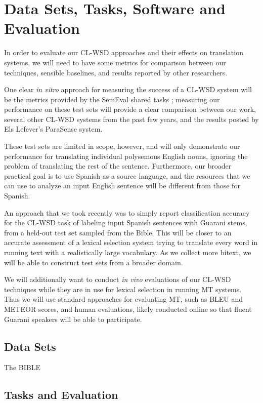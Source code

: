 \chapter{Data Sets, Tasks, Software and Evaluation}
\label{chap:evaluation}

In order to evaluate our CL-WSD approaches and their effects on translation
systems, we will need to have some metrics for comparison between our
techniques, sensible baselines, and results reported by other researchers.

One clear \emph{in vitro} approach for measuring the success of a CL-WSD system
will be the metrics provided by the SemEval shared tasks
\cite{task10}; measuring our performance on these test
sets will provide a clear comparison between our work, several other CL-WSD
systems from the past few years, and the results posted by Els Lefever's
ParaSense system.

These test sets are limited in scope, however, and will only demonstrate our
performance for translating individual polysemous English nouns, ignoring the
problem of translating the rest of the sentence.
Furthermore, our broader practical goal is to use Spanish as a source language,
and the resources that we can use to analyze an input English sentence will be
different from those for Spanish.

An approach that we took recently \cite{rudnick-gasser:2013:HyTra-2013} was to
simply report classification accuracy for the CL-WSD task of labeling input
Spanish sentences with Guarani stems, from a held-out test set sampled from the
Bible.
This will be closer to an accurate assessment of a lexical selection system
trying to translate every word in running text with a realistically large
vocabulary. As we collect more bitext, we will be able to construct test sets
from a broader domain.

We will additionally want to conduct \emph{in vivo} evaluations of our CL-WSD
techniques while they are in use for lexical selection in running MT systems.
Thus we will use standard approaches for evaluating MT, such as BLEU and METEOR
scores, and human evaluations, likely conducted online so that fluent Guarani
speakers will be able to participate.


\section{Data Sets}
The BIBLE


\section{Tasks and Evaluation}


